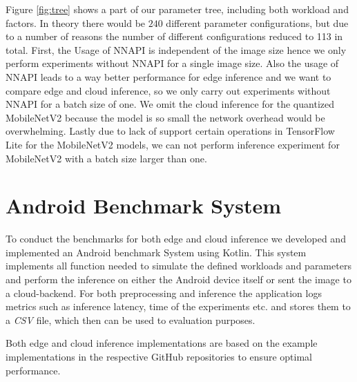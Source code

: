 \vspace{15pt}
Figure \ref{fig:tree} shows a part of our parameter tree, including both workload and factors. In theory there would be $240$ different parameter configurations, but due to a number of reasons the number of different configurations reduced to 113 in total.
First, the Usage of NNAPI is independent of the image size hence we only perform experiments without NNAPI for a single image size. Also the usage of NNAPI leads to a way better performance for edge inference and we want to compare edge and cloud inference, so we only carry out experiments without NNAPI for a batch size of one.
We omit the cloud inference for the quantized MobileNetV2 because the model is so small the network overhead would be overwhelming.%
Lastly due to lack of support certain operations in TensorFlow Lite for the MobileNetV2 models, we can not perform inference experiment for MobileNetV2 with a batch size larger than one.

\section{Android Benchmark System}
\label{chap:androidApp}
To conduct the benchmarks for both edge and cloud inference we developed and implemented an Android benchmark System using Kotlin.
This system implements all function needed to simulate the defined workloads and parameters and perform the inference on either the Android device itself or sent the image to a cloud-backend.
For both preprocessing and inference the application logs metrics such as inference latency, time of the experiments etc. and stores them to a \emph{CSV} file, which then can be used to evaluation purposes.

Both edge and cloud inference implementations are based on the example implementations in the respective GitHub repositories to ensure optimal performance. 


